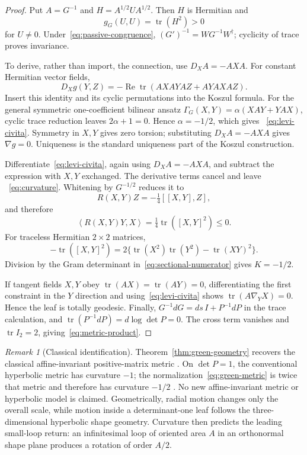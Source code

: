 \documentclass[12pt]{article}
\theoremstyle{definition}
\theoremstyle{remark}
\newtheorem{remark}[theorem]{Remark}
\newcommand{\tr}{\operatorname{tr}}
\newcommand{\ip}[2]{\left\langle #1,#2\right\rangle}
\begin{document}
\begin{proof}
Put $A=G^{-1}$ and
$H=A^{1/2}UA^{1/2}$.  Then $H$ is Hermitian and
\[
 g_G(U,U)=\tr(H^2)>0
\]
for $U\ne0$.  Under~\eqref{eq:passive-congruence},
$(G')^{-1}=WG^{-1}W^\dagger$; cyclicity of trace proves invariance.

To derive, rather than import, the connection, use
$D_XA=-AXA$.  For constant Hermitian vector fields,
\[
D_Xg(Y,Z)
=-\operatorname{Re}\tr(AXAYAZ+AYAXAZ).
\]
Insert this identity and its cyclic permutations into the Koszul formula.
For the general symmetric one-coefficient bilinear ansatz
$\Gamma_G(X,Y)=\alpha(XAY+YAX)$, cyclic trace reduction leaves
$2\alpha+1=0$.  Hence $\alpha=-1/2$, which gives
~\eqref{eq:levi-civita}.  Symmetry in $X,Y$ gives zero torsion; substituting
$D_XA=-AXA$ gives $\nabla g=0$.  Uniqueness is the standard uniqueness part
of the Koszul construction.

Differentiate~\eqref{eq:levi-civita}, again using $D_XA=-AXA$, and subtract
the expression with $X,Y$ exchanged.  The derivative terms cancel and leave
~\eqref{eq:curvature}.  Whitening by $G^{-1/2}$ reduces it to
\begin{equation}\label{eq:whitened-curvature}
 R(X,Y)Z=-\tfrac14[[X,Y],Z],
\end{equation}
and therefore
\begin{equation}\label{eq:sectional-numerator}
 \ip{R(X,Y)Y}{X}
 =\tfrac14\tr([X,Y]^2)\le0.
\end{equation}
For traceless Hermitian $2\times2$ matrices,
\[
 -\tr([X,Y]^2)
 =2\{\tr(X^2)\tr(Y^2)-\tr(XY)^2\}.
\]
Division by the Gram determinant in~\eqref{eq:sectional-numerator} gives
$K=-1/2$.

If tangent fields $X,Y$ obey $\tr(AX)=\tr(AY)=0$, differentiating the first
constraint in the $Y$ direction and using~\eqref{eq:levi-civita} shows
$\tr(A\nabla_YX)=0$.  Hence the leaf is totally geodesic.  Finally,
$G^{-1}dG=ds\,I+P^{-1}dP$ in the trace calculation, and
$\tr(P^{-1}dP)=d\log\det P=0$.  The cross term vanishes and $\tr I_2=2$,
giving~\eqref{eq:metric-product}.
\end{proof}

\begin{remark}[Classical identification]\label{rem:classical-geometry}
Theorem~\ref{thm:green-geometry} recovers the classical affine-invariant
positive-matrix metric \cite{ThanwerdasPennec2023,HiaiPetz2009}.  On
$\det P=1$, the conventional hyperbolic metric has curvature $-1$; the
normalization~\eqref{eq:green-metric} is twice that metric and therefore has
curvature $-1/2$ \cite{Bryant1987}.  No new affine-invariant metric or
hyperbolic model is claimed.  Geometrically, radial motion changes only the
overall scale, while motion inside a determinant-one leaf follows the
three-dimensional hyperbolic shape geometry.  Curvature then predicts the
leading small-loop return: an infinitesimal loop of oriented area $A$ in an
orthonormal shape plane produces a rotation of order $A/2$.
\end{remark}
\end{document}
